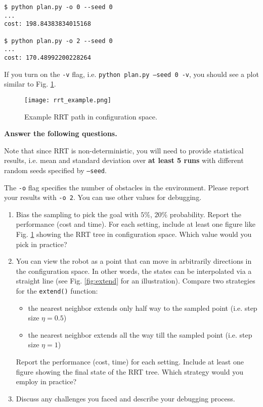 \documentclass{article}
\begin{document}
\begin{verbatim}
$ python plan.py -o 0 --seed 0
...
cost: 198.84383834015168

$ python plan.py -o 2 --seed 0
...
cost: 170.48992200228264
\end{verbatim}

If you turn on the \texttt{-v} flag, i.e. \texttt{python plan.py --seed 0 -v}, you should see a plot similar to Fig. \ref{fig:rrt}.

\begin{figure}[h]
    \centering
    \texttt{[image: rrt\_example.png]}
    \caption{Example RRT path in configuration space.}
    \label{fig:rrt}
\end{figure}

\textbf{Answer the following questions.}

Note that since RRT is non-deterministic, you will need to provide statistical results, i.e. mean and standard deviation over \textbf{at least 5 runs} with different random seeds specified by \texttt{--seed}.

The \texttt{-o} flag specifies the number of obstacles in the environment. Please report your results with \texttt{-o 2}. You can use other values for debugging.

\begin{enumerate}
    \item Bias the sampling to pick the goal with $5\%$, $20\%$ probability. Report the performance (cost and time). For each setting, include at least one figure like Fig. \ref{fig:rrt} showing the RRT tree in configuration space. Which value would you pick in practice?
    \item You can view the robot as a point that can move in arbitrarily directions in the configuration space. In other words, the states can be interpolated via a straight line (see Fig. \ref{fig:extend} for an illustration). Compare two strategies for the \texttt{extend()} function:
    \begin{itemize}
        \item the nearest neighbor extends only half way to the sampled point (i.e. step size $\eta=0.5$)
        \item the nearest neighbor extends all the way till the sampled point (i.e. step size $\eta=1$)
    \end{itemize}
    Report the performance (cost, time) for each setting. Include at least one figure showing the final state of the RRT tree. Which strategy would you employ in practice?
    \item Discuss any challenges you faced and describe your debugging process.
\end{enumerate}
\end{document}

